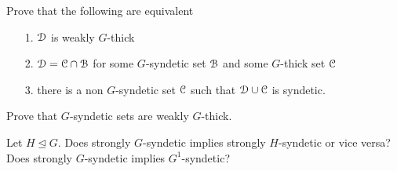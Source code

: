 




\begin{exercise}
  Prove that the following are equivalent
  \begin{itemize}
    \item[1.] $\EuScript D$ is weakly $G$-thick
    \item[2.] $\EuScript D=\EuScript C\cap\EuScript B$ for some $G$-syndetic set $\EuScript B$ and some $G$-thick set $\EuScript C$
    \item [3.] there is a non $G$-syndetic set $\EuScript C$ such that $\EuScript D\cup\EuScript C$ is syndetic.
  \end{itemize}
\end{exercise}

\begin{exercise}
  Prove that $G$-syndetic sets are weakly $G$-thick.
\end{exercise}

\begin{question}
  Let $H\trianglelefteq G$.
  Does strongly $G$-syndetic implies strongly $H$-syndetic or vice versa?
  Does strongly $G$-syndetic implies $G^1$-syndetic?
\end{question}

